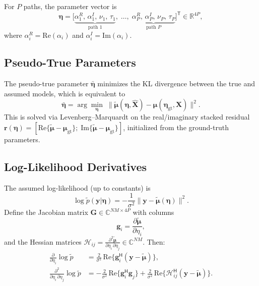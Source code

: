 \documentclass[11pt,a4paper]{article}
\newcommand{\bmmu}{\bm{\mu}}
\newcommand{\bmtildemu}{\bm{\tilde{\mu}}}
\newcommand{\bmeta}{\bm{\eta}}
\newcommand{\bmetabar}{\bm{\bar{\eta}}}
\newcommand{\bmy}{\bm{y}}
\newcommand{\bmX}{\bm{X}}
\newcommand{\bmXhat}{\bm{\hat{X}}}
\newcommand{\bmg}{\bm{g}}
\begin{document}
For $P$ paths, the parameter vector is
\begin{equation}
  \bmeta = \bigl[\underbrace{\alpha_1^{R},\,\alpha_1^{I},\,
  \nu_1,\,\tau_1}_{\text{path 1}},\;\dots,\;
  \underbrace{\alpha_P^{R},\,\alpha_P^{I},\,
  \nu_P,\,\tau_P}_{\text{path }P}\bigr]^{\mathsf T}
  \in\mathbb{R}^{4P},
  \label{eq:eta_def}
\end{equation}
where $\alpha_i^{R} = \mathrm{Re}(\alpha_i)$ and
$\alpha_i^{I} = \mathrm{Im}(\alpha_i)$.

\subsection{Pseudo-True Parameters}

The pseudo-true parameter $\bmetabar$ minimizes the KL divergence
between the true and assumed models, which is equivalent to
\begin{equation}
  \bmetabar = \arg\min_{\bmeta}\;
  \bigl\|\bmtildemu(\bmeta,\bmXhat)
  - \bmmu(\bmeta_{\mathrm{gt}},\bmX)\bigr\|^{2}.
  \label{eq:pt}
\end{equation}
This is solved via Levenberg--Marquardt on the real/imaginary stacked
residual
$\bm{r}(\bmeta) = [\mathrm{Re}\{\bmtildemu-\bmmu_{\mathrm{gt}}\};\;
\mathrm{Im}\{\bmtildemu-\bmmu_{\mathrm{gt}}\}]$, initialized from
the ground-truth parameters.

\subsection{Log-Likelihood Derivatives}

The assumed log-likelihood (up to constants) is
\begin{equation}
  \log\tilde{p}(\bmy|\bmeta)
  = -\frac{1}{\sigma^2}
  \bigl\|\bmy - \bmtildemu(\bmeta)\bigr\|^{2}.
\end{equation}
Define the Jacobian matrix $\bm{G}\in\mathbb{C}^{NM\times 4P}$ with
columns
\begin{equation}
  \bmg_i = \frac{\partial\bmtildemu}{\partial\eta_i},
\end{equation}
and the Hessian matrices
$\bm{\mathcal{H}}_{ij} = \frac{\partial^2\bmtildemu}
{\partial\eta_i\,\partial\eta_j} \in \mathbb{C}^{NM}$. Then:
\begin{align}
  \frac{\partial}{\partial\eta_i}\log\tilde{p}
  &= \frac{2}{\sigma^2}\,\mathrm{Re}\!\bigl\{
    \bmg_i^{\mathsf H}(\bmy - \bmtildemu)\bigr\},
  \label{eq:score}\\[4pt]
  \frac{\partial^2}{\partial\eta_i\,\partial\eta_j}\log\tilde{p}
  &= -\frac{2}{\sigma^2}\,\mathrm{Re}\!\bigl\{
    \bmg_i^{\mathsf H}\bmg_j\bigr\}
  + \frac{2}{\sigma^2}\,\mathrm{Re}\!\bigl\{
    \bm{\mathcal{H}}_{ij}^{\mathsf H}(\bmy - \bmtildemu)\bigr\}.
  \label{eq:hessian_logp}
\end{align}
\end{document}

